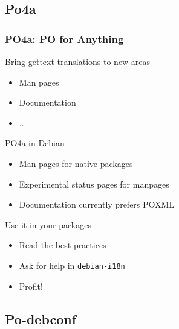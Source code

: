 \documentclass{beamer}
\begin{document}
\subsection{Po4a}

\begin{frame}
  \frametitle{PO4a: PO for Anything}
	\begin{block}
		{Bring gettext translations to new areas}
		\begin{itemize}
		\item
			Man pages
		\item
			Documentation
		\item
			...
		\end{itemize}
	\end{block}
	\begin{block}
		{PO4a in Debian}
		\begin{itemize}
		\item
			Man pages for native packages
		\item
			Experimental status pages for manpages
		\item
			Documentation currently prefers POXML
		\end{itemize}
	\end{block}
	\begin{block}
		{Use it in your packages}
		\begin{itemize}
		\item
			Read the best practices
		\item
			{Ask for help in \texttt{debian-i18n}}
		\item
			Profit!
		\end{itemize}
	\end{block}
\end{frame}

\subsection{Po-debconf}
\end{document}
